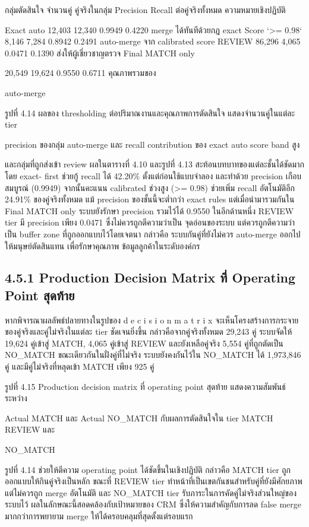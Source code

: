 \documentclass[12pt,a4paper]{report}
\begin{document}
กลุ่มตัดสินใจ จำนวนคู่ คู่จริงในกลุ่ม Precision Recall ต่อคู่จริงทั้งหมด ความหมายเชิงปฏิบัติ\par
Exact auto 12,403 12,340 0.9949 0.4220 merge ได้ทันทีด้วยกฎ exact Score `>= 0.98` 8,146 7,284 0.8942 0.2491 auto-merge จาก calibrated score REVIEW 86,296 4,065 0.0471 0.1390 ส่งให้ผู้เชี่ยวชาญตรวจ Final MATCH only\par
20,549 19,624 0.9550 0.6711 คุณภาพรวมของ\par
auto-merge\par
\clearpage
\begin{center}\small รูปที่ 4.14 ผลของ thresholding ต่อปริมาณงานและคุณภาพการตัดสินใจ แสดงจำนวนคู่ในแต่ละ tier\end{center}
precision ของกลุ่ม auto-merge และ recall contribution ของ exact auto score band สูง\par
และกลุ่มที่ถูกส่งเข้า review ผลในตารางที่ 4.10 และรูปที่ 4.13 สะท้อนบทบาทของแต่ละชั้นได้ชัดมาก โดย exact- first ช่วยกู้ recall ได้ 42.20\% ตั้งแต่ก่อนใช้แบบจำลอง และทำด้วย precision เกือบสมบูรณ์ (0.9949) จากนั้นคะแนน calibrated ช่วงสูง (>= 0.98) ช่วยเพิ่ม recall อัตโนมัติอีก 24.91\% ของคู่จริงทั้งหมด แม้ precision ของชั้นนี้จะต่ำกว่า exact rules แต่เมื่อนำมารวมกันใน Final MATCH only ระบบยังรักษา precision รวมไว้ได้ 0.9550 ในอีกด้านหนึ่ง REVIEW tier มี precision เพียง 0.0471 ซึ่งไม่ควรถูกตีความว่าเป็น จุดอ่อนของระบบ แต่ควรถูกตีความว่าเป็น buffer zone ที่ถูกออกแบบไว้โดยเจตนา กล่าวคือ ระบบกันคู่ที่ยังไม่ควร auto-merge ออกไปให้มนุษย์ตัดสินแทน เพื่อรักษาคุณภาพ ข้อมูลลูกค้าในระดับองค์กร\par
\subsection*{4.5.1 Production Decision Matrix ที่ Operating Point สุดท้าย}
หากพิจารณาผลลัพธ์ปลายทางในรูปของ d e c i s i o n m a t r i x จะเห็นโครงสร้างการกระจายของคู่จริงและคู่ไม่จริงในแต่ละ tier ชัดเจนยิ่งขึ้น กล่าวคือจากคู่จริงทั้งหมด 29,243 คู่ ระบบจัดให้ 19,624 คู่เข้าสู่ MATCH, 4,065 คู่เข้าสู่ REVIEW และยังเหลือคู่จริง 5,554 คู่ที่ถูกตัดเป็น NO\_MATCH ขณะเดียวกันในฝั่งคู่ที่ไม่จริง ระบบยังคงกันไว้ใน NO\_MATCH ได้ 1,973,846 คู่ และมีคู่ไม่จริงที่หลุดเข้า MATCH เพียง 925 คู่\par
\clearpage
\begin{center}\small รูปที่ 4.15 Production decision matrix ที่ operating point สุดท้าย แสดงความสัมพันธ์ระหว่าง\end{center}
Actual MATCH และ Actual NO\_MATCH กับผลการตัดสินใจใน tier MATCH REVIEW และ\par
NO\_MATCH\par
\begin{center}\small รูปที่ 4.14 ช่วยให้ตีความ operating point ได้ชัดขึ้นในเชิงปฏิบัติ กล่าวคือ MATCH tier ถูกออกแบบให้กินคู่จริงเป็นหลัก ขณะที่ REVIEW tier ทำหน้าที่เป็นเขตกันชนสำหรับคู่ที่ยังมีศักยภาพแต่ไม่ควรถูก merge อัตโนมัติ และ NO\_MATCH tier รับภาระในการคัดคู่ไม่จริงส่วนใหญ่ของระบบไว้ ผลในลักษณะนี้สอดคล้องกับเป้าหมายของ CRM ซึ่งให้ความสำคัญกับการลด false merge มากกว่าการพยายาม merge ให้ได้ครอบคลุมที่สุดตั้งแต่รอบแรก\end{center}
\end{document}
